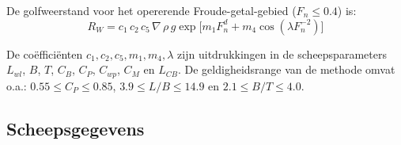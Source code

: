 De golfweerstand voor het opererende Froude-getal-gebied ($F_n \leq 0.4$) is:
\begin{equation}
    R_W = c_1\,c_2\,c_5\,\nabla\,\rho\,g \exp\!\bigl[m_1 F_n^d + m_4 \cos(\lambda F_n^{-2})\bigr]
    \label{eq:RW}
\end{equation}
 
\noindent De coëfficiënten $c_1, c_2, c_5, m_1, m_4, \lambda$ zijn uitdrukkingen in de
scheepsparameters $L_{wl}$, $B$, $T$, $C_B$, $C_P$, $C_{wp}$, $C_M$ en $L_{CB}$.
De geldigheidsrange van de methode omvat o.a.:
$0.55 \leq C_P \leq 0.85$, $3.9 \leq L/B \leq 14.9$ en $2.1 \leq B/T \leq 4.0$.
 
\subsection{Scheepsgegevens}
\label{subsec:holtrop-scheepsgegevens}
 
